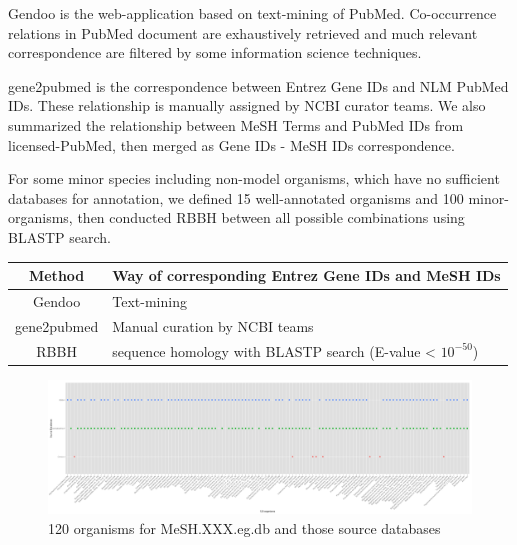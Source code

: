 \documentclass[11pt]{article}
\begin{document}
Gendoo is the web-application based on text-mining of PubMed. Co-occurrence relations in PubMed document are exhaustively retrieved and much relevant correspondence are filtered by some information science techniques.

gene2pubmed is the correspondence between Entrez Gene IDs and NLM PubMed IDs. These relationship is manually assigned by NCBI curator teams. We also summarized the relationship between MeSH Terms and PubMed IDs from licensed-PubMed, then merged as Gene IDs - MeSH IDs correspondence.

For some minor species including non-model organisms, which have no sufficient databases for annotation, we defined 15 well-annotated organisms and 100 minor-organisms, then conducted RBBH between all possible combinations using BLASTP search.
\begin{center}
  \begin{table}[htbp]
    \begin{tabular}{|c|l|}\hline
      Method & Way of corresponding Entrez Gene IDs and MeSH IDs \\ \hline \hline
      Gendoo & Text-mining \\ \hline
      gene2pubmed & Manual curation by NCBI teams \\ \hline
      RBBH & sequence homology with BLASTP search (E-value < $10^{-50}$) \\ \hline
\end{tabular}
  \end{table}
\end{center}

\begin{figure}[ht]
\centering
\includegraphics[width=\linewidth,angle=270]{fig3.png}
\caption{120 organisms for MeSH.XXX.eg.db and those source databases}
\label{fig3}
\end{figure}
\clearpage
\end{document}
